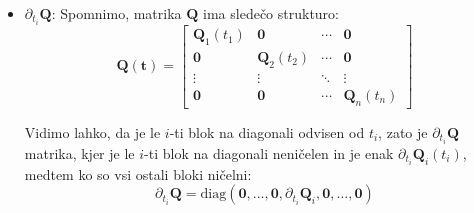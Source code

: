 \documentclass[mat2, tisk]{fmfdelo}
\newcommand{\qmat}{\mathbf{Q}}
\newcommand{\tvec}{\mathbf{t}}
\begin{document}
\begin{itemize}
\item $\partial_{t_i}\qmat$: Spomnimo, matrika $\qmat$ ima sledečo strukturo:
\begin{equation}
    \qmat(\tvec) = \begin{bmatrix}
    \qmat_1(t_1) & \mathbf{0} & \cdots & \mathbf{0} \\
    \mathbf{0} & \qmat_2(t_2) & \cdots & \mathbf{0} \\
    \vdots & \vdots & \ddots & \vdots \\
    \mathbf{0} & \mathbf{0} & \cdots & \qmat_n(t_n)
    \end{bmatrix}
\end{equation}

Vidimo lahko, da je le $i$-ti blok na diagonali odvisen od $t_i$, zato je $\partial_{t_i}\qmat$ matrika, kjer je le $i$-ti blok na diagonali neničelen in je enak $\partial_{t_i}\qmat_i(t_i)$, medtem ko so vsi ostali bloki ničelni:
\begin{equation}
    \partial_{t_i} \mathbf{Q} = \text{diag}(\mathbf{0}, \ldots, \mathbf{0}, \partial_{t_i} \qmat_i, \mathbf{0}, \ldots, \mathbf{0})
\end{equation}



\end{itemize}
\end{document}
